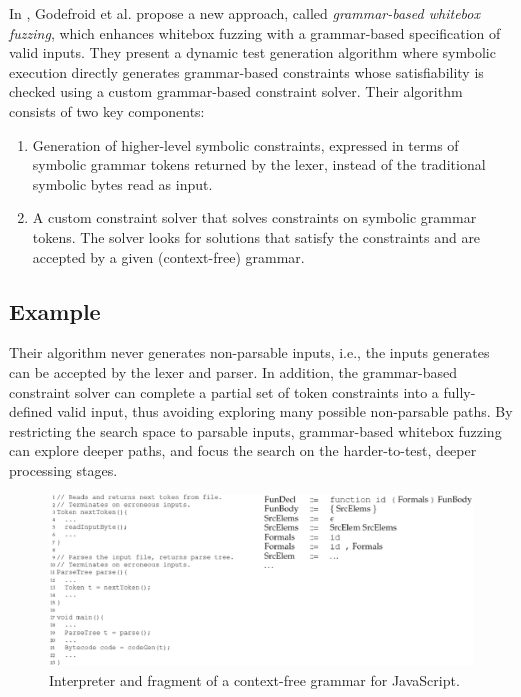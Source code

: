 In \cite{grammar}, Godefroid et al. propose a new approach, called \textit{grammar-based whitebox fuzzing}, which enhances whitebox fuzzing with a grammar-based specification of valid inputs. They present a dynamic test generation algorithm where symbolic execution directly generates grammar-based constraints whose satisfiability is checked using a custom grammar-based constraint solver. Their algorithm consists of two key components:

\begin{enumerate}
\item Generation of higher-level symbolic constraints, expressed in terms of symbolic grammar tokens returned by the
lexer, instead of the traditional~\cite{dart,exe,fuzzing} symbolic bytes read as input.
	
\item A custom constraint solver that solves constraints on symbolic grammar tokens. The solver looks for solutions
that satisfy the constraints and are accepted by a given (context-free) grammar.
\end{enumerate}

\subsection{Example}
Their algorithm never generates non-parsable inputs, i.e., the inputs generates can be accepted by the lexer and parser. In addition, the grammar-based constraint solver can complete a partial set of token constraints into a fully-defined valid input, thus avoiding exploring many possible non-parsable paths. By restricting the search space to parsable inputs, grammar-based whitebox fuzzing can explore deeper paths, and focus the search on the harder-to-test, deeper processing stages.


\begin{figure}[h]
\centering
\includegraphics[scale=0.6]{grammar.eps} 
\caption{\label{fig:grammar} Interpreter and fragment of a context-free grammar for JavaScript. }
\end{figure}

